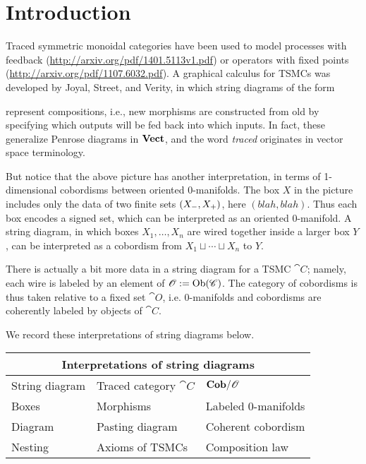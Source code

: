 \chapter{Introduction}

Traced symmetric monoidal categories have been used to model processes with feedback (\url{http://arxiv.org/pdf/1401.5113v1.pdf})  or operators with fixed points (\url{http://arxiv.org/pdf/1107.6032.pdf}). A graphical calculus for TSMCs was developed by Joyal, Street, and Verity, in which string diagrams of the form
\begin{center}\end{center}
represent compositions, i.e., new morphisms are constructed from old by specifying which outputs will be fed back into which inputs. In fact, these generalize Penrose diagrams in $\mathbf{Vect}$, and the word \emph{traced} originates in vector space terminology.  

But notice that the above picture has another interpretation, in terms of 1-dimensional cobordisms between oriented 0-manifolds. The box $X$ in the picture includes only the data of two finite sets $({X_-},{X_+})$, here $(blah,blah)$. Thus each box encodes a signed set, which can be interpreted as an oriented 0-manifold. A string diagram, in which boxes $X_1,\ldots,X_n$ are wired together inside a larger box $Y$, can be interpreted as a cobordism from $X_1\sqcup\cdots\sqcup X_n$ to $Y$. 

There is actually a bit more data in a string diagram for a TSMC $\cat{C}$; namely, each wire is labeled by an element of $\mathscr{O}:=\operatorname{Ob}(\mathscr{C})$. The category of cobordisms is thus taken relative to a fixed set $\cat{O}$, i.e. 0-manifolds and cobordisms are coherently labeled by objects of $\cat{C}$.

We record these interpretations of string diagrams below.

\begin{center}
\begin{tabular}{| l | l | l |}
\hline
\multicolumn{3}{|c|}{Interpretations of string diagrams}\\\hline\hline
String diagram & Traced category $\cat{C}$ & $\mathbf{Cob}/\mathscr{O}$\\\hline
Boxes & Morphisms & Labeled 0-manifolds\\
Diagram & Pasting diagram & Coherent cobordism\\
Nesting & Axioms of TSMCs & Composition law\\\hline
\end{tabular}
\end{center}

